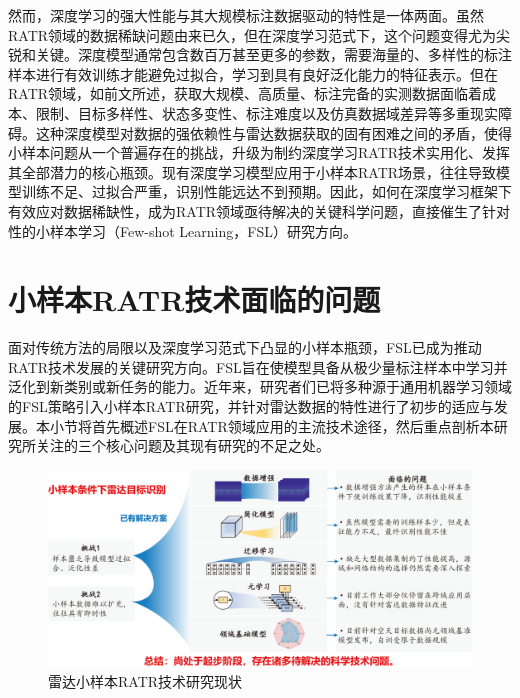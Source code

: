 然而，深度学习的强大性能与其大规模标注数据驱动的特性是一体两面。虽然RATR领域的数据稀缺问题由来已久，但在深度学习范式下，这个问题变得尤为尖锐和关键。深度模型通常包含数百万甚至更多的参数，需要海量的、多样性的标注样本进行有效训练才能避免过拟合，学习到具有良好泛化能力的特征表示。但在RATR领域，如前文所述，获取大规模、高质量、标注完备的实测数据面临着成本、限制、目标多样性、状态多变性、标注难度以及仿真数据域差异等多重现实障碍。这种深度模型对数据的强依赖性与雷达数据获取的固有困难之间的矛盾，使得小样本问题从一个普遍存在的挑战，升级为制约深度学习RATR技术实用化、发挥其全部潜力的核心瓶颈。现有深度学习模型应用于小样本RATR场景，往往导致模型训练不足、过拟合严重，识别性能远达不到预期。因此，如何在深度学习框架下有效应对数据稀缺性，成为RATR领域亟待解决的关键科学问题，直接催生了针对性的小样本学习（Few-shot Learning，FSL）研究方向。

\section{小样本RATR技术面临的问题} %
\label{sec:fsl_challenges} %
面对传统方法的局限以及深度学习范式下凸显的小样本瓶颈，FSL已成为推动RATR技术发展的关键研究方向。FSL旨在使模型具备从极少量标注样本中学习并泛化到新类别或新任务的能力。近年来，研究者们已将多种源于通用机器学习领域的FSL策略引入小样本RATR研究，并针对雷达数据的特性进行了初步的适应与发展。本小节将首先概述FSL在RATR领域应用的主流技术途径，然后重点剖析本研究所关注的三个核心问题及其现有研究的不足之处。

\begin{figure}[h]
    \centering
    \includegraphics[width=\linewidth]{figures/review.pdf} %
    \caption{雷达小样本RATR技术研究现状}
    \label{fig:meta_learning_paradigms}
\end{figure}

